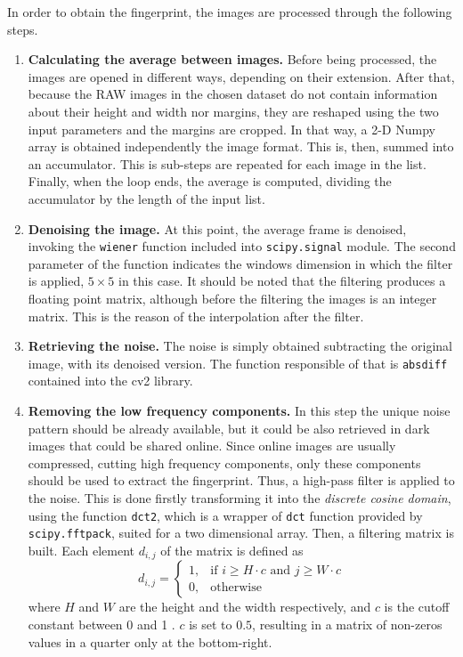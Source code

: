 In order to obtain the fingerprint, the images are processed through the following steps.
\begin{enumerate}
\item \textbf{Calculating the average between images.}
        Before being processed, the images are opened in different ways, depending on their extension. After that, because the RAW images in the chosen dataset do not contain information about their height and width nor margins, they are reshaped using the two input parameters and the margins are cropped. In that way, a 2-D Numpy array is obtained independently the image format. This is, then, summed into an accumulator. This is sub-steps are repeated for each image in the list. Finally, when the loop ends, the average is computed, dividing the accumulator by the length of the input list.
\item \textbf{Denoising the image.}
        At this point, the average frame is denoised, invoking the \texttt{wiener} function included into \texttt{scipy.signal} module. The second parameter of the function indicates the windows dimension in which the filter is applied, $5\times5$ in this case. It should be noted that the filtering produces a floating point matrix, although before the filtering the images is an integer matrix. This is the reason of the interpolation after the filter.
\item \textbf{Retrieving the noise.}
        The noise is simply obtained subtracting the original image, with its denoised version. The function responsible of that is \texttt{absdiff} contained into the cv2 library.
\item \textbf{Removing the low frequency components.}
        In this step the unique noise pattern should be already available, but it could be also retrieved in dark images that could be shared online. Since online images are usually compressed, cutting high frequency components, only these components should be used to extract the fingerprint. Thus, a high-pass filter is applied to the noise. This is done firstly transforming it into the \emph{discrete cosine domain}, using the function \texttt{dct2}, which is a wrapper of \texttt{dct} function provided by \texttt{scipy.fftpack}, suited for a two dimensional array. Then, a filtering matrix is built. Each element $d_{i,j}$ of the matrix is defined as
        \begin{equation}
          d_{i,j} = \begin{cases} 1, & \mbox{if } i \geq H \cdot c \mbox{ and } j \geq W \cdot c\\ 0, & \mbox{otherwise} \end{cases}
        \end{equation}
        where $H$ and  $W$ are the height and the width respectively, and $c$ is the cutoff constant between 0 and 1 \cite{campuf}.
        $c$ is set to $0.5$, resulting in a matrix of non-zeros values in a quarter only at the bottom-right.


\end{enumerate}
